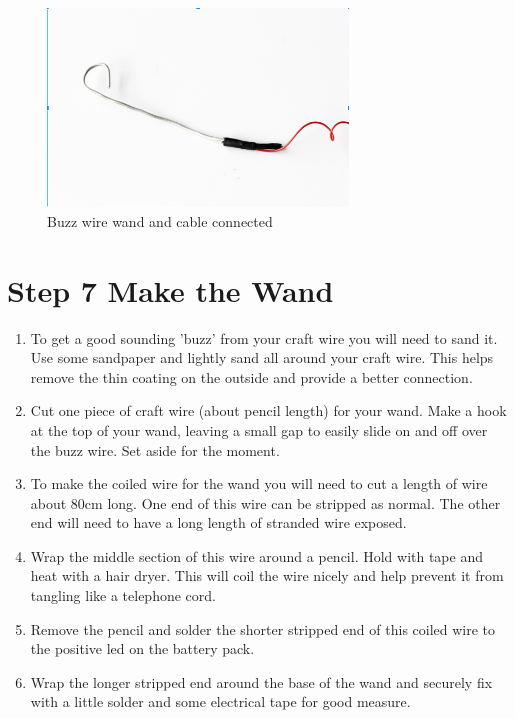 %
\begin{figure}[ht]
	\centering
	\includegraphics[width=8cm]{images/wand_cable_connected}
	\caption{Buzz wire wand and cable connected}
	\label{fig:wand_cable_connected}
\end{figure}
%

%
\section*{Step 7 Make the Wand}

\begin{enumerate}
	\item To get a good sounding 'buzz' from your craft wire you will need to sand it. Use some sandpaper and lightly sand all around your craft wire. This helps remove the thin coating on the outside and provide a better connection.
	
	\item Cut one piece of craft wire (about pencil length) for your wand. Make a hook at the top of your wand, leaving a small gap to easily slide on and off over the buzz wire. Set aside for the moment.
	
	\item To make the coiled wire for the wand you will need to cut a length of wire about 80cm long. One end of this wire can be stripped as normal. The other end will need to have a long length of stranded wire exposed.
	
	\item Wrap the middle section of this wire around a pencil. Hold with tape and heat with a hair dryer. This will coil the wire nicely and help prevent it from tangling like a telephone cord.
	
	\item Remove the pencil and solder the shorter stripped end of this coiled wire to the positive led on the battery pack.
	
	\item Wrap the longer stripped end around the base of the wand and securely fix with a little solder and some electrical tape for good measure.
\end{enumerate}


